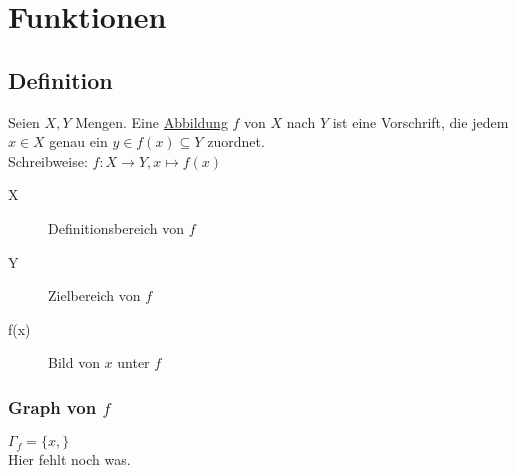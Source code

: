 \chapter{Funktionen}
\section{Definition}
Seien $X, Y$ Mengen.
Eine \ul{Abbildung} $f$ von $X$ nach $Y$ ist eine Vorschrift, die jedem $x \in X$ genau ein $y\in f(x) \subseteq Y$ zuordnet.\\
Schreibweise: $f: X \to Y, x \mapsto f(x)$\\
\begin{description}
	\item[X] Definitionsbereich von $f$
	\item[Y] Zielbereich von $f$
	\item[f(x)] Bild von $x$ unter $f$
\end{description}
\subsection*{Graph von $f$}
$\Gamma_f = \{x, \}$\\ Hier fehlt noch was. 
